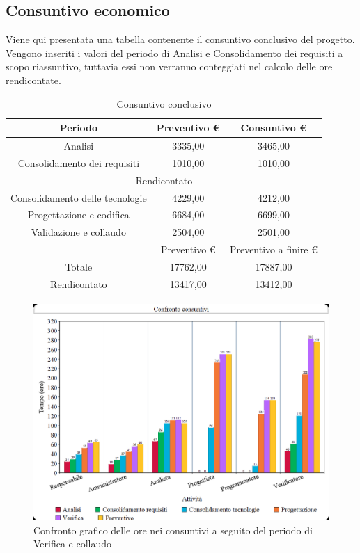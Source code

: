 \documentclass[./PianodiProgetto.tex]{subfiles}
\begin{document}
\subsection{Consuntivo economico}
Viene qui presentata una tabella contenente il consuntivo conclusivo del progetto. Vengono inseriti i valori del periodo di Analisi e Consolidamento dei requisiti a scopo riassuntivo,
tuttavia essi non verranno conteggiati nel calcolo delle ore rendicontate.

\begin{table}[H]
	\centering
	\begin{tabular}{|c|c|c|}
		\hline
		Periodo&Preventivo \euro{}&Consuntivo \euro{} \\ \hline
		Analisi&3335,00&3465,00  \\ \hline
		Consolidamento dei requisiti&1010,00&1010,00  \\ \hline
		\multicolumn{3}{|c|}{Rendicontato}  \\ \hline
		Consolidamento delle tecnologie&4229,00&4212,00  \\ \hline
		Progettazione e codifica&6684,00&6699,00  \\ \hline
		Validazione e collaudo&2504,00&2501,00  \\ \hline
		&Preventivo \euro{}&Preventivo a finire \euro{}  \\ \hline
		Totale&17762,00&17887,00 \\ \hline
		Rendicontato&13417,00&13412,00 \\ \hline
	\end{tabular}
	\caption{Consuntivo conclusivo}
\end{table}

\begin{figure}[H]
	\centering
	\includegraphics[width=1\linewidth]{img/grafici/OreConsuntivo/consuntivo-ore-verifica}
	\caption{Confronto grafico delle ore nei consuntivi a seguito del periodo di Verifica e collaudo}
	\label{fig:consuntivo-ore-verifica}
\end{figure}
\end{document}
